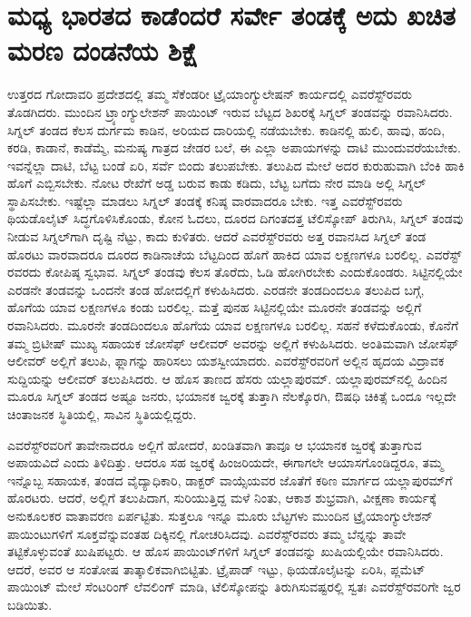 
\chapter{ಮಧ್ಯ ಭಾರತದ ಕಾಡೆಂದರೆ ಸರ್ವೇ ತಂಡಕ್ಕೆ ಅದು ಖಚಿತ ಮರಣ ದಂಡನೆಯ ಶಿಕ್ಷೆ}

ಉತ್ತರದ ಗೋದಾವರಿ ಪ್ರದೇಶದಲ್ಲಿ ತಮ್ಮ ಸೆಕೆಂಡರೀ ಟ್ರೈಯಾಂಗ್ಯುಲೇಷನ್​ ಕಾರ್ಯದಲ್ಲಿ ಎವರೆಸ್ಟ್​ರವರು ತೊಡಗಿದರು. ಮುಂದಿನ ಟ್ರ್ಯಾಂಗ್ಯುಲೇಶನ್​ ಪಾಯಿಂಟ್​ ಇರುವ ಬೆಟ್ಟದ ಶಿಖರಕ್ಕೆ ಸಿಗ್ನಲ್​ ತಂಡವನ್ನು ರವಾನಿಸಿದರು. ಸಿಗ್ನಲ್​ ತಂಡದ ಕೆಲಸ ದುರ್ಗಮ ಕಾಡಿನ, ಅರಿಯದ ದಾರಿಯಲ್ಲಿ ನಡೆಯಬೇಕು. ಕಾಡಿನಲ್ಲಿ ಹುಲಿ, ಹಾವು, ಹಂದಿ, ಕರಡಿ, ಕಾಡಾನೆ, ಕಾಡೆಮ್ಮೆ, ಮನುಷ್ಯ ಗಾತ್ರದ ಜೇಡರ ಬಲೆ, ಈ ಎಲ್ಲಾ ಅಪಾಯಗಳನ್ನು ದಾಟಿ ಮುಂದುವರೆಯಬೇಕು. ಇವನ್ನೆಲ್ಲಾ ದಾಟಿ, ಬೆಟ್ಟ ಬಂಡೆ ಏರಿ, ಸರ್ವೆ ಬಿಂದು ತಲುಪಬೇಕು. ತಲುಪಿದ ಮೇಲೆ ಅದರ ಕುರುಹುವಾಗಿ ಬೆಂಕಿ ಹಾಕಿ ಹೊಗೆ ಎಬ್ಬಿಸಬೇಕು. ನೋಟ ರೇಖೆಗೆ ಅಡ್ಡ ಬರುವ ಕಾಡು ಕಡಿದು, ಬೆಟ್ಟ ಬಗೆದು ನೇರ ಮಾಡಿ ಅಲ್ಲಿ ಸಿಗ್ನಲ್​ ಸ್ಥಾಪಿಸಬೇಕು. ಇಷ್ಟೆಲ್ಲಾ ಮಾಡಲು ಸಿಗ್ನಲ್​ ತಂಡಕ್ಕೆ ಕನಿಷ್ಠ  ವಾರವಾದರೂ ಬೇಕು. ಇತ್ತ ಎವರೆಸ್ಟ್​ರವರು ಥಿಯಡೊಲೈಟ್​ ಸಿದ್ಧಗೊಳಿಸಿಕೊಂಡು, ಕೋನ ಓದಲು, ದೂರದ ದಿಗಂತದತ್ತ ಟೆಲಿಸ್ಕೋಪ್​ ತಿರುಗಿಸಿ, ಸಿಗ್ನಲ್​ ತಂಡವು ನೀಡುವ ಸಿಗ್ನಲ್​ಗಾಗಿ ದೃಷ್ಟಿ ನೆಟ್ಟು, ಕಾದು ಕುಳಿತರು. ಆದರೆ ಎವರೆಸ್ಟ್​ರವರು ಅತ್ತ ರವಾನಸಿದ ಸಿಗ್ನಲ್​ ತಂಡ ಹೊರಟು  ವಾರವಾದರೂ ದೂರದ ಕಾಡಿನಾಚೆಯ ಬೆಟ್ಟದಿಂದ ಹೊಗೆ ಹಾಕಿದ ಯಾವ ಲಕ್ಷಣಗಳೂ ಬರಲಿಲ್ಲ. ಎವರೆಸ್ಟ್​ರವರದು ಕೋಪಿಷ್ಠ ಸ್ವಭಾವ. ಸಿಗ್ನಲ್​ ತಂಡವು ಕೆಲಸ ತೊರೆದು, ಓಡಿ ಹೋಗಿರಬೇಕು ಎಂದುಕೊಂಡರು. ಸಿಟ್ಟಿನಲ್ಲಿಯೇ ಎರಡನೇ ತಂಡವನ್ನು ಒಂದನೇ ತಂಡ ಹೋದಲ್ಲಿಗೆ ಕಳುಹಿಸಿದರು. ಎರಡನೇ ತಂಡದಿಂದಲೂ ತಲುಪಿದ ಬಗ್ಗೆ, ಹೊಗೆಯ ಯಾವ ಲಕ್ಷಣಗಳೂ ಕಂಡು ಬರಲಿಲ್ಲ. ಮತ್ತೆ ಪುನಹ ಸಿಟ್ಟಿನಲ್ಲಿಯೇ ಮೂರನೇ ತಂಡವನ್ನು ಅಲ್ಲಿಗೆ ರವಾನಿಸಿದರು. ಮೂರನೇ ತಂಡದಿಂದಲೂ ಹೊಗೆಯ ಯಾವ ಲಕ್ಷಣಗಳೂ ಬರಲಿಲ್ಲ. ಸಹನೆ ಕಳೆದುಕೊಂಡು, ಕೊನೆಗೆ ತಮ್ಮ ಬ್ರಿಟೀಷ್​ ಮುಖ್ಯ ಸಹಾಯಕ ಜೋಸೆಫ್​ ಆಲೀವರ್​ ಅವರನ್ನು ಅಲ್ಲಿಗೆ ಕಳುಹಿಸಿದರು. ಅಂತಿಮವಾಗಿ ಜೋಸೆಫ್​ ಆಲೀವರ್​ ಅಲ್ಲಿಗೆ ತಲುಪಿ, ಫ್ಲಾಗನ್ನು ಹಾರಿಸಲು ಯಶಸ್ವೀಯಾದರು. ಎವರೆಸ್ಟ್​ರವರಿಗೆ ಅಲ್ಲಿನ ಹೃದಯ ವಿದ್ರಾವಕ ಸುದ್ದಿಯನ್ನು ಆಲೀವರ್​ ತಲುಪಿಸಿದರು. ಆ ಹೊಸ ತಾಣದ ಹೆಸರು ಯಲ್ಲಾಪುರಮ್. ಯಲ್ಲಾಪುರಮ್‌ನಲ್ಲಿ ಹಿಂದಿನ ಮೂರೂ ಸಿಗ್ನಲ್​ ತಂಡದ ಅಷ್ಟೂ ಜನರು, ಭಯಾನಕ ಜ್ವರಕ್ಕೆ ತುತ್ತಾಗಿ ನೆಲಕ್ಕೊರಗಿ, ಔಷಧಿ ಚಿಕಿತ್ಸೆ ಒಂದೂ ಇಲ್ಲದೇ ಚಿಂತಾಜನಕ ಸ್ಥಿತಿಯಲ್ಲಿ, ಸಾವಿನ ಸ್ಥಿತಿಯಲ್ಲಿದ್ದರು.

ಎವರೆಸ್ಟ್​ರವರಿಗೆ ತಾವೇನಾದರೂ ಅಲ್ಲಿಗೆ ಹೋದರೆ, ಖಂಡಿತವಾಗಿ ತಾವೂ ಆ ಭಯಾನಕ ಜ್ವರಕ್ಕೆ ತುತ್ತಾಗುವ ಅಪಾಯವಿದೆ ಎಂದು ತಿಳಿದಿತ್ತು. ಆದರೂ ಸಹ ಜ್ವರಕ್ಕೆ ಹಿಂಜರಿಯದೇ, ಈಗಾಗಲೇ ಆಯಾಸಗೊಂಡಿದ್ದರೂ, ತಮ್ಮ ಇನ್ನೊಬ್ಬ ಸಹಾಯಕ, ತಂಡದ ವೈದ್ಯಾಧಿಕಾರಿ, ಡಾಕ್ಟರ್​ ವಾಯ್ಸೆಯವರ ಜೊತೆಗೆ ಕಠಿಣ ಮಾರ್ಗದ ಯಲ್ಲಾಪುರಮ್‌ಗೆ ಹೊರಟರು. ಆದರೆ, ಅಲ್ಲಿಗೆ ತಲುಪಿದಾಗ, ಸುರಿಯುತ್ತಿದ್ದ ಮಳೆ ನಿಂತು, ಆಕಾಶ ಶುಭ್ರವಾಗಿ, ವೀಕ್ಷಣಾ ಕಾರ್ಯಕ್ಕೆ ಅನುಕೂಲಕರ ವಾತಾವರಣ ಏರ್ಪಟ್ಟಿತು. ಸುತ್ತಲೂ ಇನ್ನೂ ಮೂರು ಬೆಟ್ಟಗಳು ಮುಂದಿನ ಟ್ರೈಯಾಂಗ್ಯುಲೇಶನ್​ ಪಾಯಿಂಟುಗಳಿಗೆ ಸೂಕ್ತವೆನ್ನುವಂತಹ ದಿಕ್ಕಿನಲ್ಲಿ ಗೋಚರಿಸಿದವು. ಎವರೆಸ್ಟ್​ರವರು ತಮ್ಮ ಬೆನ್ನನ್ನು ತಾವೇ ತಟ್ಟಿಕೊಳ್ಳುವಂತೆ ಖುಷಿಪಟ್ಟರು. ಆ ಹೊಸ ಪಾಯಿಂಟ್​ಗಳಿಗೆ ಸಿಗ್ನಲ್​ ತಂಡವನ್ನು ಖುಷಿಯಲ್ಲಿಯೇ ರವಾನಿಸಿದರು. ಆದರೆ, ಅವರ ಆ ಸಂತೋಷ ತಾತ್ಕಾಲಿಕವಾಗಿಬಿಟ್ಟಿತು. ಟ್ರೈಪಾಡ್​ ಇಟ್ಟು, ಥಿಯಡೊಲೈಟನ್ನು ಏರಿಸಿ, ಪ್ಲಮೆಟ್​ ಪಾಯಿಂಟ್​ ಮೇಲೆ ಸೆಂಟರಿಂಗ್​ ಲೆವಲಿಂಗ್​ ಮಾಡಿ, ಟೆಲಿಸ್ಕೋಪನ್ನು ತಿರುಗಿಸುವಷ್ಟರಲ್ಲಿ ಸ್ವತಃ ಎವರೆಸ್ಟ್​ರವರಿಗೇ ಜ್ವರ ಬಡಿಯಿತು.

